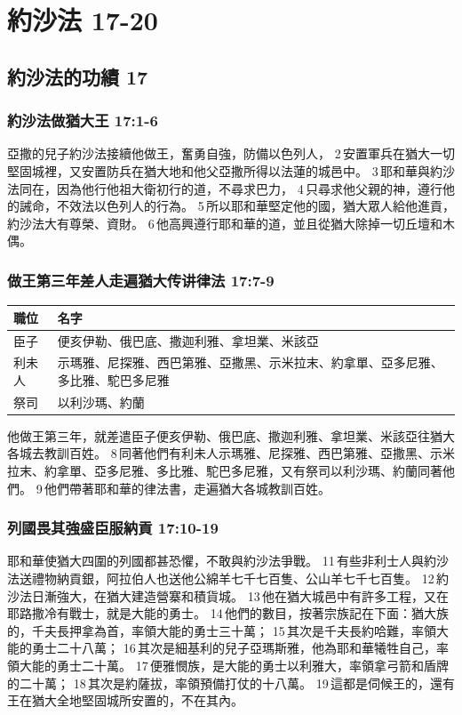 \section{約沙法 17-20 }
\subsection{約沙法的功績 17}
\subsubsection{約沙法做猶大王 17:1-6}
亞撒的兒子約沙法接續他做王，奮勇自強，防備以色列人， 2 安置軍兵在猶大一切堅固城裡，又安置防兵在猶大地和他父亞撒所得以法蓮的城邑中。 3 耶和華與約沙法同在，因為他行他祖大衛初行的道，不尋求巴力， 4 只尋求他父親的神，遵行他的誡命，不效法以色列人的行為。 5 所以耶和華堅定他的國，猶大眾人給他進貢，約沙法大有尊榮、資財。 6 他高興遵行耶和華的道，並且從猶大除掉一切丘壇和木偶。

\subsubsection{做王第三年差人走遍猶大传讲律法 17:7-9}
\begin{table}
\vspace{-10mm}
\centering
\begin{tabular}{p{1.25cm}|p{5.75cm}}\hline\hline
 職位& 名字\\\hline\hline
 臣子&便亥伊勒、俄巴底、撒迦利雅、拿坦業、米該亞 \\\hline
利未人&示瑪雅、尼探雅、西巴第雅、亞撒黑、示米拉末、約拿單、亞多尼雅、多比雅、駝巴多尼雅\\\hline
 祭司&以利沙瑪、約蘭\\\hline
\end{tabular} 
\end{table}
他做王第三年，就差遣臣子便亥伊勒、俄巴底、撒迦利雅、拿坦業、米該亞往猶大各城去教訓百姓。 8 同著他們有利未人示瑪雅、尼探雅、西巴第雅、亞撒黑、示米拉末、約拿單、亞多尼雅、多比雅、駝巴多尼雅，又有祭司以利沙瑪、約蘭同著他們。 9 他們帶著耶和華的律法書，走遍猶大各城教訓百姓。

\subsubsection{列國畏其強盛臣服納貢 17:10-19}
耶和華使猶大四圍的列國都甚恐懼，不敢與約沙法爭戰。 11 有些非利士人與約沙法送禮物納貢銀，阿拉伯人也送他公綿羊七千七百隻、公山羊七千七百隻。 12 約沙法日漸強大，在猶大建造營寨和積貨城。 13 他在猶大城邑中有許多工程，又在耶路撒冷有戰士，就是大能的勇士。 14 他們的數目，按著宗族記在下面：猶大族的，千夫長押拿為首，率領大能的勇士三十萬； 15 其次是千夫長約哈難，率領大能的勇士二十八萬； 16 其次是細基利的兒子亞瑪斯雅，他為耶和華犧牲自己，率領大能的勇士二十萬。 17 便雅憫族，是大能的勇士以利雅大，率領拿弓箭和盾牌的二十萬； 18 其次是約薩拔，率領預備打仗的十八萬。 19 這都是伺候王的，還有王在猶大全地堅固城所安置的，不在其內。

